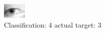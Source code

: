 \begin{figure}[h!]
\begin{center}
\includegraphics[width=0.60\columnwidth]{figures/ID1415_class_4_target_3.png}
\end{center}
\caption{ Classification: 4 actual target: 3}
\label{fig:ID1415_class_4_target_3}
\end{figure}
